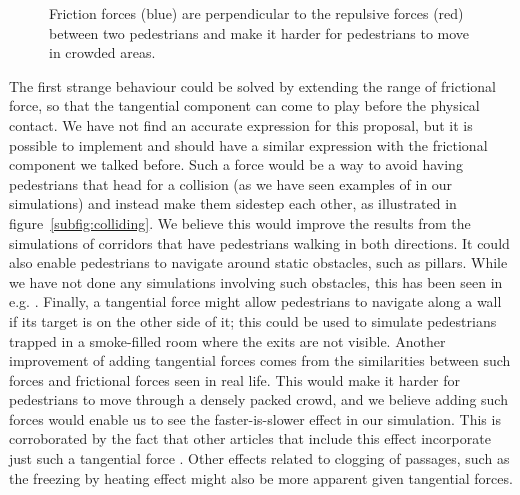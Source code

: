 \begin{figure}
    \centering
    \caption[Friction forces]{Friction forces (blue) are perpendicular to the 
    repulsive forces (red) between two pedestrians and make it harder for 
    pedestrians to move in crowded areas.}
    \label{fig:friction}
\end{figure}

The first strange behaviour could be solved by extending the range of 
frictional force, so that the tangential component can come to play before 
the physical contact. We have not find an accurate expression for this 
proposal, but it is possible to implement and should have a similar expression 
with the frictional component we talked before.
Such a force would be a way to avoid having pedestrians that 
head for a collision (as we have seen examples of in our simulations) 
and instead make them sidestep each other, as illustrated in 
figure~\ref{subfig:colliding}. We believe this would improve the results from 
the simulations of corridors that have pedestrians walking in both directions. 
It could also enable pedestrians to navigate around static obstacles, such as 
pillars. While we have not done any simulations involving such obstacles, this 
has been seen in e.g. \cite{tang}. Finally, a tangential force might allow 
pedestrians to navigate along a wall if its target is on the other side of it; 
this could be used to simulate pedestrians trapped in a smoke-filled room 
where the exits are not visible.
Another improvement of adding tangential forces comes from the similarities 
between such forces and frictional forces seen in real life. This would make 
it harder for pedestrians to move through a densely packed crowd, and we 
believe adding such forces would enable us to see the faster-is-slower effect 
in our simulation. This is corroborated by the fact that other articles that 
include this effect incorporate just such a tangential force \cite{helbing00}. 
Other effects related to clogging of passages, such as the freezing by heating 
effect might also be more apparent given tangential forces.


